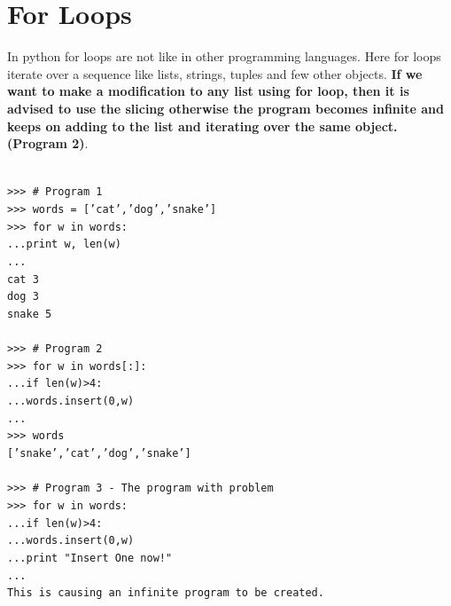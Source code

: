 \documentclass[12pt,a4paper]{article}
\begin{document}
\section{For Loops}
In python for loops are not like in other programming languages. Here for loops iterate over a sequence like lists, strings, tuples and few other objects. \textbf{If we want to make a modification to any list using for loop, then it is advised to use the slicing otherwise the program becomes infinite and keeps on adding to the list and iterating over the same object.(Program 2)}.


\texttt{\\
>>> \# Program 1\\
>>> words = ['cat','dog','snake']\\
>>> for w in words:\\
...\hspace{30pt}print w, len(w)\\
...\\
cat 3\\
dog 3\\
snake 5\\
\\
>>> \# Program 2\\
>>> for w in words[:]:\\
...\hspace{30pt}if len(w)>4:\\
...\hspace{30pt}\hspace{30pt}words.insert(0,w)\\
...\\
>>> words\\
{['snake','cat','dog','snake']}\\
\\
>>> \# Program 3 - The program with problem\\
>>> for w in words:\\
...\hspace{30pt}if len(w)>4:\\
...\hspace{30pt}\hspace{30pt}words.insert(0,w)\\
...\hspace{30pt}\hspace{30pt}print "Insert One now!"\\
...\\
This is causing an infinite program to be created.\\
}
\end{document}
